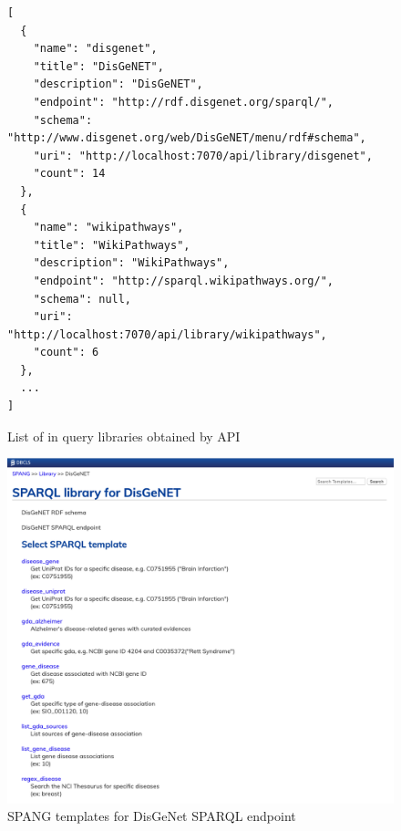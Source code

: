 \documentclass[runningheads]{llncs}
\begin{document}
\begin{figure}[!t]
\begin{scriptsize}
\begin{verbatim}
[
  {
    "name": "disgenet",
    "title": "DisGeNET",
    "description": "DisGeNET",
    "endpoint": "http://rdf.disgenet.org/sparql/",
    "schema": "http://www.disgenet.org/web/DisGeNET/menu/rdf#schema",
    "uri": "http://localhost:7070/api/library/disgenet",
    "count": 14
  },
  {
    "name": "wikipathways",
    "title": "WikiPathways",
    "description": "WikiPathways",
    "endpoint": "http://sparql.wikipathways.org/",
    "schema": null,
    "uri": "http://localhost:7070/api/library/wikipathways",
    "count": 6
  },
  ...
]
\end{verbatim}
\end{scriptsize}
\caption{List of in query libraries obtained by API}
\label{fig:libs-api-out}
\end{figure}


\begin{figure}
\center
\includegraphics[width=1.0\textwidth]{spang_disgenet.png}
\caption{SPANG templates for DisGeNet SPARQL endpoint}
\label{fig:spang_disgenet}
\end{figure}
\end{document}
